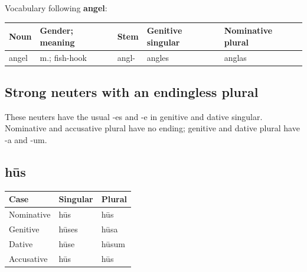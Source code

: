 Vocabulary following \textbf{angel}:

\par\begingroup
\fontsize{10.5}{13.2}\selectfont
\setlength{\LTleft}{0pt}\setlength{\LTright}{\fill}
\noindent
\begin{tabular}{@{}>{\raggedright\arraybackslash}p{19.82mm}>{\raggedright\arraybackslash}p{23.18mm}>{\raggedright\arraybackslash}p{19.82mm}>{\raggedright\arraybackslash}p{23.88mm}>{\raggedright\arraybackslash}p{26.06mm}@{}}
\toprule
\textbf{Noun} & \textbf{Gender; meaning} & \textbf{Stem} & \textbf{Genitive singular} & \textbf{Nominative plural} \\
\midrule
angel & m.; fish-hook & angl- & angles & anglas \\
\bottomrule
\end{tabular}
\par\endgroup

\subsection*{Strong neuters with an endingless plural}

These neuters have the usual -es and -e in genitive and dative singular. Nominative and accusative plural have no ending; genitive and dative plural have -a and -um.

\subsection*{hūs}

\par\begingroup
\fontsize{10.5}{13.2}\selectfont
\setlength{\LTleft}{0pt}\setlength{\LTright}{\fill}
\noindent
\begin{tabular}{@{}>{\raggedright\arraybackslash}p{39.46mm}>{\raggedright\arraybackslash}p{39.46mm}>{\raggedright\arraybackslash}p{39.46mm}@{}}
\toprule
\textbf{Case} & \textbf{Singular} & \textbf{Plural} \\
\midrule
Nominative & hūs & hūs \\
Genitive & hūses & hūsa \\
Dative & hūse & hūsum \\
Accusative & hūs & hūs \\
\bottomrule
\end{tabular}
\par\endgroup

